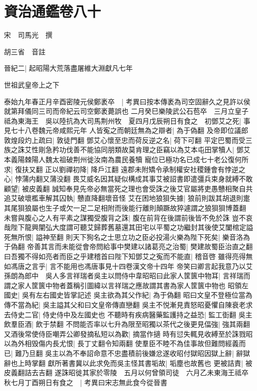\chapter{資治通鑑卷八十}
宋　司馬光　撰

胡三省　音註

晉紀二|{
	起昭陽大荒落盡屠維大淵獻凡七年}


世祖武皇帝上之下

泰始九年春正月辛酉密陵元侯鄭袤卒　|{
	考異曰按本傳袤為司空固辭久之見許以侯就第拜儀同三司而帝紀云司空鄭袤薨誤也}
二月癸巳樂陵武公石苞卒　三月立皇子祗為東海王　吳以陸抗為大司馬荆州牧　夏四月戊辰朔日有食之　初鄧艾之死|{
	事見七十八卷魏元帝咸熙元年}
人皆寃之而朝廷無為之辯者|{
	為于偽翻}
及帝即位議郎敦煌段灼上疏曰|{
	敦徒門翻}
鄧艾心懷至忠而荷反逆之名|{
	荷下可翻}
平定巴蜀而受三族之誅艾性剛急矜功伐善不能協同朋類故莫肯理之臣竊以為艾本屯田掌犢人|{
	鄧艾本義陽棘陽人魏太祖破荆州徙汝南為農民養犢}
寵位已極功名已成七十老公復何所求|{
	復扶又翻}
正以劉禪初降|{
	降戶江翻}
遠郡未附矯令承制權安社稷鍾會有悖逆之心|{
	悖蒲内翻又蒲没翻}
畏艾威名因其疑似構成其事艾被詔書即遣彊兵束身就縛不敢顧望|{
	被皮義翻}
誠知奉見先帝必無當死之理也會受誅之後艾官屬將吏愚戇相聚自共追艾破壞檻車解其囚執|{
	戇直降翻壞音怪}
艾在困地狼狽失據|{
	狼前則跋其胡退則疐其尾狽狼屬也生子或欠一足二足相附而後能行離則顛蹶故猝遽謂之狼狽狽博蓋翻}
未嘗與腹心之人有平素之謀獨受腹背之誅|{
	腹在前背在後謂前後皆不免於誅}
豈不哀哉陛下龍興闡弘大度謂可聽艾歸葬舊墓還其田宅以平蜀之功繼封其後使艾闔棺定謚死無所恨|{
	謚神至翻}
則天下狥名之士思立功之臣必投湯火樂為陛下死矣|{
	樂音洛為于偽翻}
帝善其言而未能從會帝問給事中樊建以諸葛亮之治蜀|{
	樊建故蜀臣治直之翻}
曰吾獨不得如亮者而臣之乎建稽首曰陛下知鄧艾之寃而不能直|{
	稽音啓}
雖得亮得無如馮唐之言乎|{
	言不能用也馮唐事見十四卷漢文帝十四年}
帝笑曰卿言起我意乃以艾孫朗為郎中　吳人多言祥瑞者吳主以問侍中韋昭昭曰此家人筐篋中物耳|{
	言祥瑞而謂之家人筐篋中物者蓋稱引圖緯以言祥瑞之應故謂其書為家人筐篋中物也}
昭領左國史|{
	吳有左右國史皆掌記述}
吳主欲為其父作紀|{
	為于偽翻}
昭曰文皇不登極位當為傳不當為紀|{
	吳主謚其父和曰文皇帝傳直戀翻}
吳主不悦漸見責怒昭憂懼自陳衰老求去侍史二官|{
	侍史侍中及左國史也}
不聽時有疾病醫藥監護持之益恐|{
	監工衘翻}
吳主飲羣臣酒|{
	飲于禁翻}
不問能否率以七升為限至昭獨以茶代之後更見偪強|{
	強其兩翻}
又酒後常使侍臣嘲弄公卿發摘私短以為歡|{
	摘當作擿}
時有愆失輒見收縛至於誅戮昭以為外相毁傷内長尤恨|{
	長丁丈翻令知兩翻}
使羣臣不睦不為佳事故但難問經義而已|{
	難乃旦翻}
吳主以為不奉詔命意不忠盡積前後嫌忿遂收昭付獄昭因獄上辭|{
	辭獄辭也上時掌翻}
獻所著書冀以此求免而吳主怪其書垢故|{
	垢塵也故舊也}
更被詰責|{
	被皮義翻詰去吉翻}
遂誅昭徙其家於零陵　五月以何曾領司徒　六月乙未東海王祗卒　秋七月丁酉朔日有食之　|{
	考異曰宋志無此食今從晉書}
